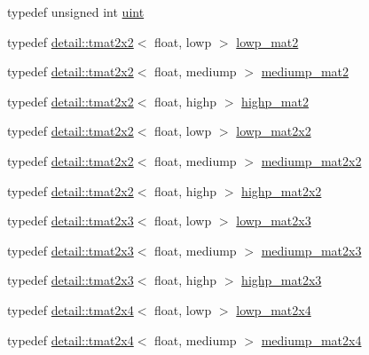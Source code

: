 \begin{DoxyCompactItemize}
\item 
typedef unsigned int \hyperlink{group__core__precision_ga4fd29415871152bfb5abd588334147c8}{uint}
\item 
typedef \hyperlink{structglm_1_1detail_1_1tmat2x2}{detail\+::tmat2x2}$<$ float, lowp $>$ \hyperlink{group__core__precision_gac0acc3ccf8da050af3393ea639f698d6}{lowp\+\_\+mat2}
\item 
typedef \hyperlink{structglm_1_1detail_1_1tmat2x2}{detail\+::tmat2x2}$<$ float, mediump $>$ \hyperlink{group__core__precision_ga6ed8bfa67b72cea216cb558411f95f86}{mediump\+\_\+mat2}
\item 
typedef \hyperlink{structglm_1_1detail_1_1tmat2x2}{detail\+::tmat2x2}$<$ float, highp $>$ \hyperlink{group__core__precision_gab9884251d84b95dbbf27aa1e4b3a1ec7}{highp\+\_\+mat2}
\item 
typedef \hyperlink{structglm_1_1detail_1_1tmat2x2}{detail\+::tmat2x2}$<$ float, lowp $>$ \hyperlink{group__core__precision_ga7d7e123d953978cc17de6882bb10400e}{lowp\+\_\+mat2x2}
\item 
typedef \hyperlink{structglm_1_1detail_1_1tmat2x2}{detail\+::tmat2x2}$<$ float, mediump $>$ \hyperlink{group__core__precision_ga867b486aea2d228a1e1a134af73b2c4b}{mediump\+\_\+mat2x2}
\item 
typedef \hyperlink{structglm_1_1detail_1_1tmat2x2}{detail\+::tmat2x2}$<$ float, highp $>$ \hyperlink{group__core__precision_ga694146b8d430b22caa8b37571d9bc8bc}{highp\+\_\+mat2x2}
\item 
typedef \hyperlink{structglm_1_1detail_1_1tmat2x3}{detail\+::tmat2x3}$<$ float, lowp $>$ \hyperlink{group__core__precision_gaef481e637af5103a83ab561d30d28f2a}{lowp\+\_\+mat2x3}
\item 
typedef \hyperlink{structglm_1_1detail_1_1tmat2x3}{detail\+::tmat2x3}$<$ float, mediump $>$ \hyperlink{group__core__precision_gad4e099c0dfa8f35ce9c0ddc8605428cf}{mediump\+\_\+mat2x3}
\item 
typedef \hyperlink{structglm_1_1detail_1_1tmat2x3}{detail\+::tmat2x3}$<$ float, highp $>$ \hyperlink{group__core__precision_ga7d4e5a1c803be5688c75241c924dfa58}{highp\+\_\+mat2x3}
\item 
typedef \hyperlink{structglm_1_1detail_1_1tmat2x4}{detail\+::tmat2x4}$<$ float, lowp $>$ \hyperlink{group__core__precision_gaa62e33ee2864909c8522a549fbf40ce5}{lowp\+\_\+mat2x4}
\item 
typedef \hyperlink{structglm_1_1detail_1_1tmat2x4}{detail\+::tmat2x4}$<$ float, mediump $>$ \hyperlink{group__core__precision_gae90cf4be1ded03a3a5b7b42045da253c}{mediump\+\_\+mat2x4}

\end{DoxyCompactItemize}

